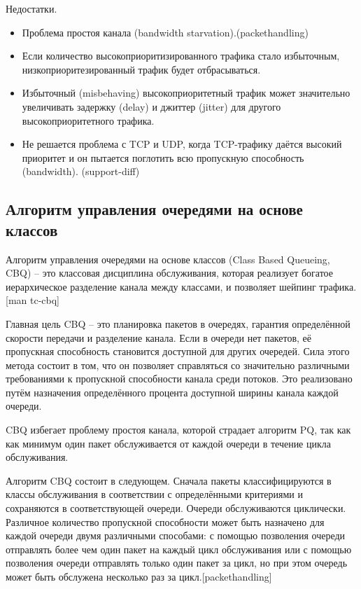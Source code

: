 	Недостатки.
	\begin{itemize}
		\item Проблема простоя канала (bandwidth starvation).(packethandling)
		\item Если количество высокоприоритизированного трафика стало избыточным,
              низкоприоритезированный трафик будет отбрасываться.
		\item Избыточный (misbehaving) высокоприоритетный трафик может значительно увеличивать
                задержку (delay) и джиттер (jitter) для другого высокоприоритетного трафика.
		\item Не решается проблема с TCP и UDP, когда TCP-трафику даётся высокий приоритет и он
                пытается поглотить всю пропускную способность (bandwidth). (support-diff)
	\end{itemize}


	\subsection{Алгоритм управления очередями на основе классов}

        Алгоритм управления очередями на основе классов (Class Based Queueing, CBQ) -- это
		классовая дисциплина обслуживания, которая реализует
        богатое иерархическое разделение канала между классами, и позволяет
		шейпинг трафика. [man tc-cbq]

        Главная цель CBQ -- это планировка пакетов в очередях, гарантия определённой
        скорости передачи и разделение канала. Если в очереди нет пакетов, её пропускная способность
        становится доступной для других очередей. Сила этого метода состоит в том, что
        он позволяет справляться со значительно различными требованиями
        к пропускной способности канала среди потоков. Это реализовано путём назначения
        определённого процента доступной ширины канала каждой очереди.
		
		CBQ избегает проблему простоя канала, которой страдает алгоритм PQ,
		так как как минимум один пакет обслуживается от каждой очереди
		в течение цикла обслуживания.

        Алгоритм CBQ состоит в следующем. Сначала пакеты классифицируются в классы
        обслуживания в соответствии с определёнными критериями и сохраняются в
        соответствующей очереди. Очереди обслуживаются циклически. Различное
        количество пропускной способности может быть назначено для каждой очереди
        двумя различными способами: с помощью позволения очереди отправлять более
        чем один пакет на каждый цикл обслуживания или с помощью позволения очереди
        отправлять только один пакет за цикл, но при этом очередь может быть обслужена
        несколько раз за цикл.[packethandling]

